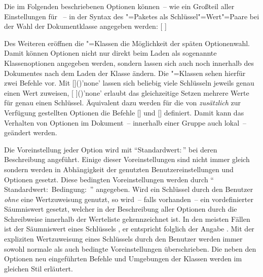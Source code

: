 Die im Folgenden beschriebenen Optionen können~-- wie ein Großteil aller 
Einstellungen für \KOMAScript~-- in der Syntax des "=Paketes 
als Schlüssel"=Wert"=Paare bei der Wahl der Dokumentklasse angegeben werden:
[%
]

Des Weiteren eröffnen die \KOMAScript"=Klassen die Möglichkeit der späten 
Optionenwahl. Damit können Optionen nicht nur direkt beim Laden als sogenannte 
Klassenoptionen angegeben werden, sondern lassen sich auch noch innerhalb des 
Dokumentes nach dem Laden der Klasse ändern. Die \KOMAScript"=Klassen sehen 
hierfür zwei Befehle vor. Mit 
[]()'none'
lassen sich beliebig viele Schlüsseln jeweils genau einen Wert zuweisen, 
[%
]()'none'
erlaubt das gleichzeitige Setzen mehrere Werte für genau einen Schlüssel. 
Äquivalent dazu werden für die von \TUDScript \emph{zusätzlich} zur Verfügung 
gestellten Optionen die Befehle [] 
und [] definiert. 
Damit kann das Verhalten von Optionen im Dokument~-- innerhalb einer Gruppe 
auch lokal~-- geändert werden.

Die Voreinstellung jeder Option wird mit \enquote{Standardwert:\,} 
bei deren Beschreibung angeführt. Einige dieser Voreinstellungen sind nicht 
immer gleich sondern werden in Abhängigkeit der genutzten Benutzereinstellungen 
und Optionen gesetzt. Diese bedingten Voreinstellungen werden durch 
\enquote{%
  Standardwert:\,%
  \PValue{\,|\,}Bedingung:\,%
}
angegeben. Wird ein Schlüssel durch den Benutzer \emph{ohne} eine Wertzuweisung 
genutzt, so wird~-- falls vorhanden~-- ein vordefinierter Säumniswert gesetzt, 
welcher in der Beschreibung aller Optionen durch die~ 
Schreibweise innerhalb der Werteliste gekennzeichnet ist. In den meisten Fällen 
ist der Säumniswert eines Schlüssels , er entspricht folglich der 
Angabe . Mit der expliziten Wertzuweisung eines 
Schlüssels durch den Benutzer werden immer sowohl normale als auch bedingte 
Voreinstellungen überschrieben. Die neben den Optionen neu eingeführten Befehle 
und Umgebungen der Klassen werden im gleichen Stil erläutert.



